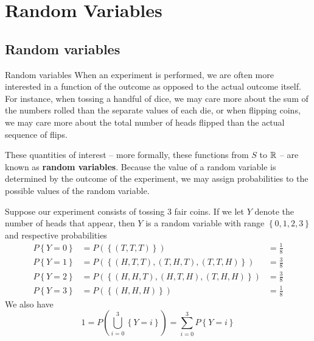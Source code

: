 \section{Random Variables}
\subsection{Random variables}
\begin{bdef}{Random variables}\label{randomvariables}
    When an experiment is performed, we are often more interested in a function of the outcome as opposed to the actual outcome itself. For instance, when tossing a handful of dice, we may care more about the sum of the numbers rolled than the separate values of each die, or when flipping coins, we may care more about the total number of heads flipped than the actual sequence of flips.

    These quantities of interest -- more formally, these functions from $S$ to $\mathbb{R}$ -- are known as \textbf{random variables}. Because the value of a random variable is determined by the outcome of the experiment, we may assign probabilities to the possible values of the random variable.
\end{bdef}
\begin{changebar}
    \begin{example}
        Suppose our experiment consists of tossing 3 fair coins. If we let $Y$ denote the number of heads that appear, then $Y$ is a random variable with range $\left\{ 0, 1, 2, 3 \right\}$ and respective probabilities \[
            \begin{aligned}
                P\left\{ Y = 0 \right\} &= P(\left\{ (T, T, T) \right\}) &= \frac{1}{8} \\
                P\left\{ Y = 1 \right\} &= P(\left\{ (H, T, T), (T, H, T), (T, T, H) \right\}) &= \frac{3}{8} \\
                P\left\{ Y = 2 \right\} &= P(\left\{ (H, H, T), (H, T, H), (T, H, H) \right\}) &= \frac{3}{8} \\
                P\left\{ Y = 3 \right\} &= P(\left\{ (H, H, H) \right\}) &= \frac{1}{8}
            \end{aligned}    
        \]
        We also have \[
            1 = P\left( \bigcup^3_{i = 0} \left\{ Y = i \right\} \right) = \sum^3_{i = 0} P\left\{ Y = i \right\}    
        \]
    \end{example}
\end{changebar}

